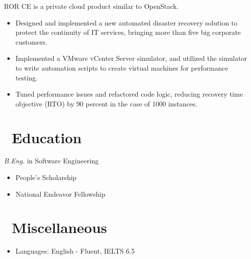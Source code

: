 \documentclass{resume}
\begin{document}
ROR CE is a private cloud product similar to OpenStack.
\begin{itemize}
  \item Designed and implemented a new automated disaster recovery solution to protect the continuity of IT services, bringing more than five big corporate customers.
  \item Implemented a VMware vCenter Server simulator, and utilized the simulator to write automation scripts to create virtual machines for performance testing.
  \item Tuned performance issues and refactored code logic, reducing recovery time objective (RTO) by 90 percent in the case of 1000 instances.
\end{itemize}


\section{\faGraduationCap\ Education}
\textit{B.Eng.} in Software Engineering
\begin{itemize}
  \item People's Scholarship
  \item National Endeavor Fellowship
\end{itemize}


\section{\faInfo\ Miscellaneous}
\begin{itemize}[parsep=0.5ex]
  \item Languages: English - Fluent, IELTS 6.5
\end{itemize}

%
%
\end{document}
